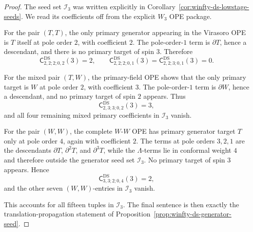 \begin{proof}
The seed set $\mathcal{I}_3$ was written explicitly in
Corollary~\ref{cor:winfty-ds-lowstage-seeds}.  We read its coefficients
off from the explicit $W_3$ OPE package.

For the pair $(T,T)$, the only primary generator appearing in the
Virasoro OPE is $T$ itself at pole order $2$, with coefficient $2$.
The pole-order-$1$ term is $\partial T$, hence a descendant, and there
is no primary target of spin $3$.  Therefore
\[
\mathsf{C}^{\mathrm{DS}}_{2,2;2;0,2}(3)=2,
\qquad
\mathsf{C}^{\mathrm{DS}}_{2,2;2;0,1}(3)=
\mathsf{C}^{\mathrm{DS}}_{2,2;3;0,1}(3)=0.
\]

For the mixed pair $(T,W)$, the primary-field OPE shows that the only
primary target is $W$ at pole order $2$, with coefficient $3$.  The
pole-order-$1$ term is $\partial W$, hence a descendant, and no primary
target of spin $2$ appears.  Thus
\[
\mathsf{C}^{\mathrm{DS}}_{2,3;3;0,2}(3)=3,
\]
and all four remaining mixed primary coefficients in $\mathcal{I}_3$
vanish.

For the pair $(W,W)$, the complete $W$-$W$ OPE has primary generator
target $T$ only at pole order $4$, again with coefficient $2$.  The
terms at pole orders $3,2,1$ are the descendants
$\partial T$, $\partial^2 T$, and $\partial^3 T$, while the
$\Lambda$-terms lie in conformal weight $4$ and therefore outside the
generator seed set $\mathcal{I}_3$.  No primary target of spin $3$
appears.  Hence
\[
\mathsf{C}^{\mathrm{DS}}_{3,3;2;0,4}(3)=2,
\]
and the other seven $(W,W)$-entries in $\mathcal{I}_3$ vanish.

This accounts for all fifteen tuples in $\mathcal{I}_3$.  The final
sentence is then exactly the translation-propagation statement of
Proposition~\ref{prop:winfty-ds-generator-seed}.
\end{proof}

